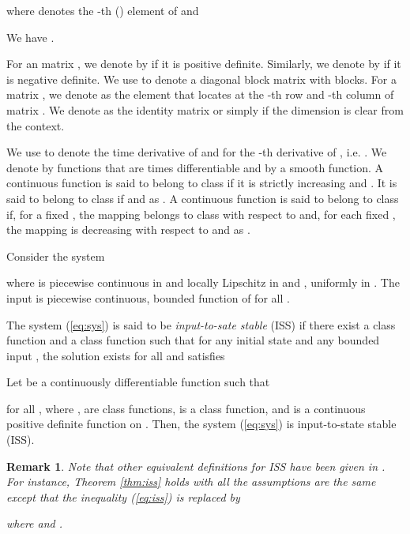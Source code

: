 \documentclass[twoside,leqno,onecolumn]{article}
\newtheorem{remark}{Remark}
\begin{document}
where  denotes the -th () element of  and

We have .

For an 
matrix , we denote by  if it is positive definite. Similarly, we denote
by  if it is negative definite. We use  to denote a
diagonal block matrix with  blocks. For a matrix , we denote  as the element that locates at the -th row and -th column of matrix . We denote  as the identity matrix or simply  if the dimension is clear from the context.

  We use  to denote the time derivative of  and  for the -th derivative of , i.e. . We denote by  functions that are  times differentiable and by  a smooth function. A continuous function  is said to belong to class  if it is strictly increasing and . It is said to belong to class  if  and  as  \cite{Khalil02}. A continuous function  is said to belong to class  if, for a fixed
, the mapping  belongs to class  with respect to  and, for each fixed , the mapping  is decreasing with respect to  and  as  \cite{Khalil02}.


Consider the system

where  is piecewise continuous in  and locally Lipschitz in  and , uniformly in . The input  is piecewise continuous, bounded function of  for all .


\begin{Definition}
\label{def:ISS}
The system (\ref{eq:sys}) is said to be \emph{input-to-sate stable} (ISS) if there exist a class  function  and a class  function  such that for any initial state  and any bounded input , the solution  exists for all  and satisfies

\end{Definition}

\begin{theorem}
\label{thm:iss}
Let  be a continuously differentiable function such that

for all , where ,  are class  functions, 
is a class  function, and  is a continuous positive definite function on . Then, the system (\ref{eq:sys}) is input-to-state stable (ISS).
\end{theorem}

\begin{remark}
Note that other equivalent definitions for ISS have been given in \cite[pp. 1974-1975]{Mali05}. For instance, Theorem \ref{thm:iss} holds with all the assumptions are the same except that the inequality (\ref{eq:iss}) is replaced by

where  and .
\end{remark}
\end{document}
